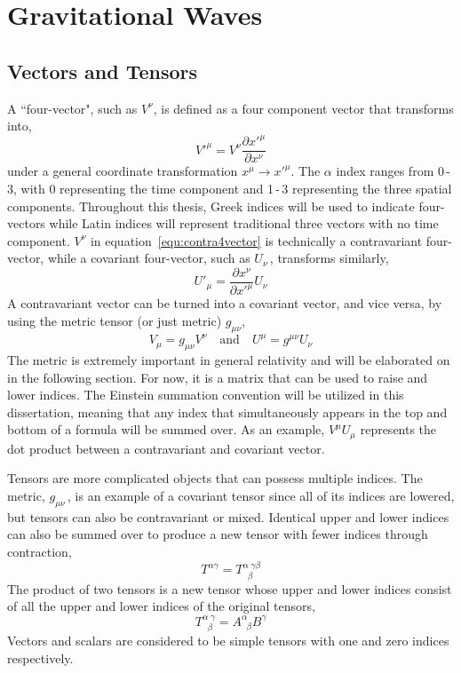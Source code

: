 \chapter{Gravitational Waves} \label{GWs}

\section{Vectors and Tensors}

A ``four-vector", such as $V^{\nu}$, is defined as a four component vector that transforms into,
\begin{equation}
\label{equ:contra4vector}
    V'^{\mu} = V^{\nu} \frac{\partial x'^{\mu}}{\partial x^{\nu}}
\end{equation}
under a general coordinate transformation $x^{\mu} \rightarrow x'^{\mu}$. The $\alpha$ index ranges from 0\,-\,3, with 0 representing the time component and 1\,-\,3 representing the three spatial components. Throughout this thesis, Greek indices will be used to indicate four-vectors while Latin indices will represent traditional three vectors with no time component. $V^{\nu}$ in equation~\ref{equ:contra4vector} is technically a contravariant four-vector, while a covariant four-vector, such as $U_{\nu}$\,, transforms similarly,
\begin{equation}
\label{equ:cov4vector}
    U'_{\mu} = \frac{\partial x^{\nu}}{\partial x'^{\mu}} U_{\nu}
\end{equation}
A contravariant vector can be turned into a covariant vector, and vice versa, by using the metric tensor (or just metric) $g_{\mu \nu}$,
\begin{equation}
\label{equ:raise_lower}
    V_{\mu} = g_{\mu \nu}V^{\nu} \quad \text{and} \quad U^{\mu} = g^{\mu \nu}U_{\nu}
\end{equation}
The metric is extremely important in general relativity and will be elaborated on in the following section. For now, it is a matrix that can be used to raise and lower indices. The Einstein summation convention will be utilized in this dissertation, meaning that any index that simultaneously appears in the top and bottom of a formula will be summed over. As an example, $V^{\mu}U_{\mu}$ represents the dot product between a contravariant and covariant vector.

Tensors are more complicated objects that can possess multiple indices. The metric, $g_{\mu\nu}$\,, is an example of a covariant tensor since all of its indices are lowered, but tensors can also be contravariant or mixed. Identical upper and lower indices can also be summed over to produce a new tensor with fewer indices through contraction,
\begin{equation}
    T^{\alpha \gamma} = T^{\alpha\;\gamma\beta}_{\;\;\beta}
\end{equation}
The product of two tensors is a new tensor whose upper and lower indices consist of all the upper and lower indices of the original tensors,
\begin{equation}
    T^{\alpha\;\gamma}_{\;\;\beta} = A^{\alpha}_{\;\;\beta}B^{\gamma}
\end{equation}
Vectors and scalars are considered to be simple tensors with one and zero indices respectively.

